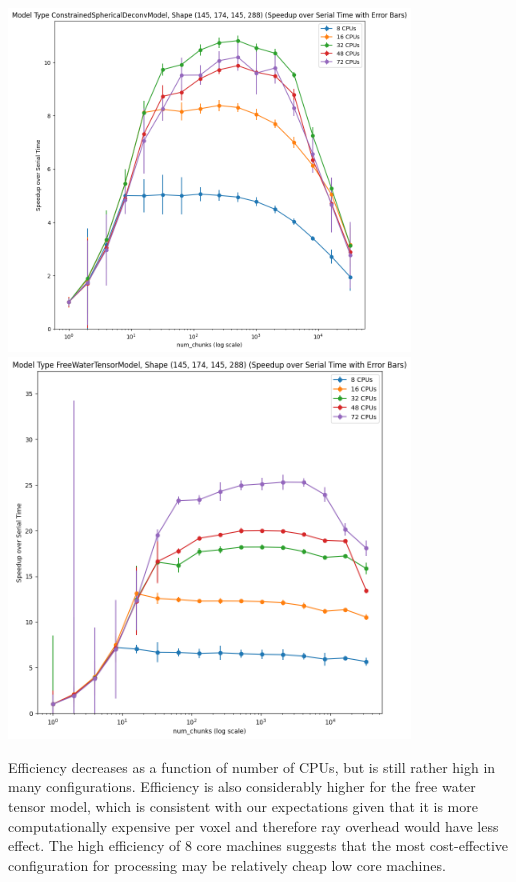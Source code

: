 \documentclass[
  letterpaper,
  DIV=11,
  numbers=noendperiod]{scrartcl}
\begin{document}
\includegraphics[width=0.8\textwidth,height=0.8\textheight]{figures/csdm_speedup.png}
\includegraphics[width=0.8\textwidth,height=0.8\textheight]{figures/fwdtim_speedup.png}

Efficiency decreases as a function of number of CPUs, but is still
rather high in many configurations. Efficiency is also considerably
higher for the free water tensor model, which is consistent with our
expectations given that it is more computationally expensive per voxel
and therefore ray overhead would have less effect. The high efficiency
of 8 core machines suggests that the most cost-effective configuration
for processing may be relatively cheap low core machines.
\end{document}
